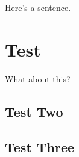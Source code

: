 \documentclass{article}
\begin{document}
	
	Here's a sentence.
	
	\section{Test}
	
	What about this? \subsection{Test Two} \subsection{Test Three}
	
	
\end{document}
